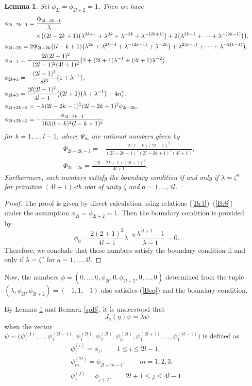 \documentclass[10pt,a4paper]{amsart}
\numberwithin{equation}{section}
\newtheorem{Lemma}[Theorem]{Lemma}
\begin{document}
		\begin{Lemma}\label{B}
		Set $\phi_{2l}=\phi_{2l+2}=1$.
		Then we have
			\begin{align*}
	&\phi_{2l-2k-1}=\frac{\Phi_{2l-2k-1}}{\lambda}\\
&\hphantom{\phi_{2l-2k-1}=}{}\times\!\bigl((2l-2k+1)\bigl(\lambda^{2k+1}+\lambda^{2k}+\lambda^{-2k}+\lambda^{-(2k+1)}\bigr) +2\bigl(\lambda^{2k-1}+\cdots+\lambda^{-(2k-1)}\bigr)\bigr),\\ &\phi_{2l-2k}=2\Phi_{2l-2k}\bigl((l-k+1)\bigl(\lambda^{2k}+\lambda^{2k-1}+\lambda^{-(2k-1)}+\lambda^{-2k}\bigr)+\lambda^{2(k-1)}+\cdots+\lambda^{-2(k-1)}\bigr),\\
			&\phi_{2l-1}=-\frac{2l(2l+1)^2}{(2l-1)^2(4l+1)^2}\bigl(2+(2l+1)\lambda^{-1}+(2l+1)\lambda^{-2}\bigr),\\
			&\phi_{2l+1}=-\frac{(2l+1)^3}{8l^3}\bigl(1+\lambda^{-1}\bigr),\\
			&\phi_{2l+3}=\frac{2l(2l+1)^2}{4l+1}\bigl((2l+1)\bigl(\lambda+\lambda^{-1}\bigr)+4n\bigr),\\
			&\phi_{2l+2k+2}=-\lambda(2l-2k-1)^2(2l-2k+1)^2\phi_{2l-2k},\\
			&\phi_{2l+2k+3}=-\frac{\phi_{2l-2k-1}}{16\lambda(l-k)^2(l-k+1)^2}
			\end{align*}
		for $k=1,\dots,l-1$, where $\Psi_m$ are rational numbers given by
			\begin{align*}
			&\Phi_{2l-2k-1}=-\frac{2(l-k)(2l+1)^2}{(2l-2k-1)^2(2l-2k+1)^2(4l+1)},\\
			&\Phi_{2l-2k}=\frac{(2l-2k+1)(2l+1)^2}{4l+1}.			
			\end{align*}
		Furthermore, such numbers satisfy the boundary condition if and only if $\lambda=\zeta^a$ for primitive $(4l+1)$-th root of unity $\zeta$ and $a=1,\dots,4l$.
		\end{Lemma}
		\begin{proof}
		The proof is given by direct calculation using relations (\ref{Br1})--(\ref{Br8}) under the assumption $\phi_{2l}=\phi_{2l+2}=1$.
		Then the boundary condition is provided by
			\[\phi_0=\frac{2(2+1)^2}{4l+1}\lambda^{-2l}\frac{\lambda^{4l+1}-1}{\lambda-1}=0.\]
		Therefore, we conclude that these numbers satisfy the boundary condition if and only if $\lambda=\zeta^a$ for $a=1,\dots,4l$.
		\end{proof}
		\begin{Remark}\label{spB}
		Now, the numbers $\phi=(0,\dots,0,\phi_{2l},0,\phi_{2l+2},0,\dots,0)$ determined from the tuple $(\lambda,\phi_{2l},\phi_{2l+2})=(-1,1,-1)$ also satisfies (\ref{Beq}) and the boundary condition.
		\end{Remark}
By Lemma \ref{B} and Remark \ref{spB}, it is understood that
	\[J_\gamma(\eta)\psi=\lambda\psi\]
when the vector $\psi=\bigl(\psi_1^{(1)},\dots,\psi_1^{(2l-1)},\psi_1^{(2l)},\psi_2^{(2l)},\psi_3^{(2l)},\psi_1^{(2l+1)},\dots,\psi_1^{(4l-1)}\bigr)$ is defined as
	\begin{gather*}
 \psi_1^{(i)}=\phi_i,\qquad 1\leq i\leq 2l-1,\\
 \psi_m^{(2l)}=\phi_{2l+m-1},\qquad m=1,2,3,\\
 \psi_1^{(j)}=\phi_{j+2},\qquad 2l+1\leq j\leq 4l-1.
 \end{gather*}
\end{document}
